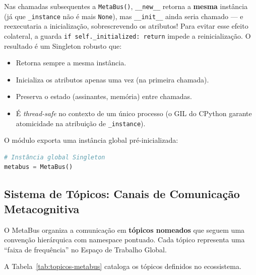 Nas chamadas subsequentes a \texttt{MetaBus()}, \texttt{\_\_new\_\_} retorna a \textbf{mesma} instância (já que \texttt{\_instance} não é mais \texttt{None}), mas \texttt{\_\_init\_\_} ainda seria chamado — e reexecutaria a inicialização, sobrescrevendo os atributos! Para evitar esse efeito colateral, a guarda \texttt{if self.\_initialized: return} impede a reinicialização. O resultado é um Singleton robusto que:

\begin{itemize}
    \item Retorna sempre a mesma instância.
    \item Inicializa os atributos apenas uma vez (na primeira chamada).
    \item Preserva o estado (assinantes, memória) entre chamadas.
    \item É \textit{thread-safe} no contexto de um único processo (o GIL do CPython garante atomicidade na atribuição de \texttt{\_instance}).
\end{itemize}

O módulo exporta uma instância global pré-inicializada:

\begin{lstlisting}[language=Python, caption={Instância global Singleton (\texttt{mci/metabus.py}, linha 154)}, label={lst:metabus-global}]
# Instância global Singleton
metabus = MetaBus()
\end{lstlisting}

\subsection{Sistema de Tópicos: Canais de Comunicação Metacognitiva}

O MetaBus organiza a comunicação em \textbf{tópicos nomeados} que seguem uma convenção hierárquica com namespace pontuado. Cada tópico representa uma ``faixa de frequência'' no Espaço de Trabalho Global.

A Tabela~\ref{tab:topicos-metabus} cataloga os tópicos definidos no ecossistema.

